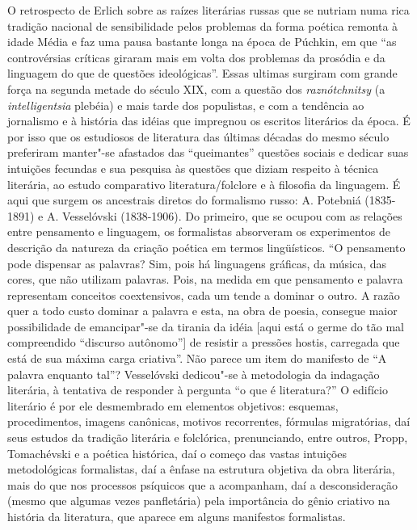 O retrospecto de Erlich sobre as raízes literárias russas que se nutriam
numa rica tradição nacional de sensibilidade pelos problemas da forma
poética remonta à idade Média e faz uma pausa bastante longa na época de
Púchkin, em que ``as controvérsias críticas giraram mais em volta dos
problemas da prosódia e da linguagem do que de questões ideológicas''.
Essas ultimas surgiram com grande força na segunda metade do século XIX,
com a questão dos \emph{raznótchnitsy} (a \emph{intelligentsia} plebéia)
e mais tarde dos populistas, e com a tendência ao jornalismo e à
história das idéias que impregnou os escritos literários da época. É por
isso que os estudiosos de literatura das últimas décadas do mesmo século
preferiram manter"-se afastados das ``queimantes'' questões sociais e
dedicar suas intuições fecundas e sua pesquisa às questões que diziam
respeito à técnica literária, ao estudo comparativo literatura/folclore
e à filosofia da linguagem. É aqui que surgem os ancestrais diretos do
formalismo russo: A. Potebniá (1835-1891) e A. Vesselóvski (1838-1906).
Do primeiro, que se ocupou com as relações entre pensamento e linguagem,
os formalistas absorveram os experimentos de descrição da natureza da
criação poética em termos lingüísticos. ``O pensamento pode dispensar as
palavras? Sim, pois há linguagens gráficas, da música, das cores, que
não utilizam palavras. Pois, na medida em que pensamento e palavra
representam conceitos coextensivos, cada um tende a dominar o outro. A
razão quer a todo custo dominar a palavra e esta, na obra de poesia,
consegue maior possibilidade de emancipar"-se da tirania da idéia {[}aqui
está o germe do tão mal compreendido ``discurso autônomo''{]} de
resistir a pressões hostis, carregada que está de sua máxima carga
criativa''. Não parece um item do manifesto de ``A palavra enquanto
tal''? Vesselóvski dedicou"-se à metodologia da indagação literária, à
tentativa de responder à pergunta ``o que é literatura?'' O edifício
literário é por ele desmembrado em elementos objetivos: esquemas,
procedimentos, imagens canônicas, motivos recorrentes, fórmulas
migratórias, daí seus estudos da tradição literária e folclórica,
prenunciando, entre outros, Propp, Tomachévski e a poética histórica,
daí o começo das vastas intuições metodológicas formalistas, daí a
ênfase na estrutura objetiva da obra literária, mais do que nos
processos psíquicos que a acompanham, daí a desconsideração (mesmo que
algumas vezes panfletária) pela importância do gênio criativo na
história da literatura, que aparece em alguns manifestos formalistas.

